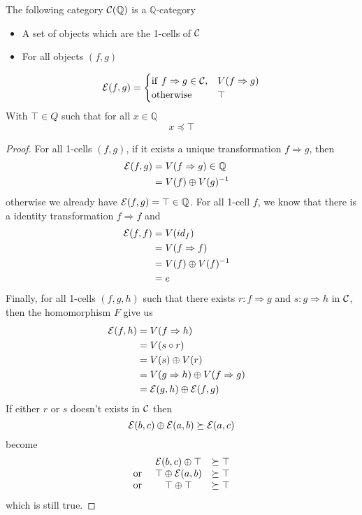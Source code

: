 \documentclass[a4paper]{article}
\begin{document}
\begin{proposition}
The following category ${\cal C}(\mathbb{Q})$ is a $\mathbb{Q}$-category
\begin{itemize}
\item A set of objects which are the 1-cells of ${\cal C}$
\item For all objects $(f, g)$
\end{itemize}
\[
{\cal E}(f, g) = \begin{cases} {\rm if~} f \Rightarrow g \in {\cal C}, &V(f \Rightarrow g) \cr {\rm otherwise~} &\top \end{cases}
\]
With $\top \in Q$ such that for all $x \in \mathbb{Q}$
\[
x \preceq \top
\]

\begin{proof}
For all 1-cells $(f, g)$, if it exists a unique transformation $f \Rightarrow g$, then
\begin{align}
{\cal E}(f, g) &= V(f \Rightarrow g) \in \mathbb{Q} \cr
&= V(f) \oplus V(g)^{-1}
\end{align}
otherwise we already have ${\cal E}(f, g) = \top \in \mathbb{Q}$.
For all 1-cell $f$, we know that there is a identity transformation $f \Rightarrow f$ and
\begin{align}
{\cal E}(f, f) &= V(id_f) \cr
&= V(f \Rightarrow f)\cr
&= V(f) \oplus V(f)^{-1} \cr
&= e
\end{align}
Finally, for all 1-cells $(f, g, h)$ such that there exists $r: f \Rightarrow g$ and $s: g \Rightarrow h$ in ${\cal C}$, then the homomorphism $F$ give us
\begin{align}
{\cal E}(f, h) &= V(f \Rightarrow h) \cr
&= V(s\circ r) \cr
&= V(s) \oplus V(r) \cr
&= V(g \Rightarrow h) \oplus V(f \Rightarrow g) \cr
&= {\cal E}(g, h) \oplus {\cal E}(f, g)
\end{align}
If either $r$ or $s$ doesn't exists in ${\cal C}$ then
\[
{\cal E}(b, c) \oplus {\cal E}(a, b) \succeq {\cal E}(a, c)
\]
become
\[\begin{matrix}
&{\cal E}(b, c) \oplus \top &\succeq \top \cr
{\rm or~} &\top \oplus {\cal E}(a, b) &\succeq \top \cr
{\rm or~} &\top \oplus \top &\succeq \top
\end{matrix}\]
which is still true.
\end{proof}
\end{proposition}
\end{document}
